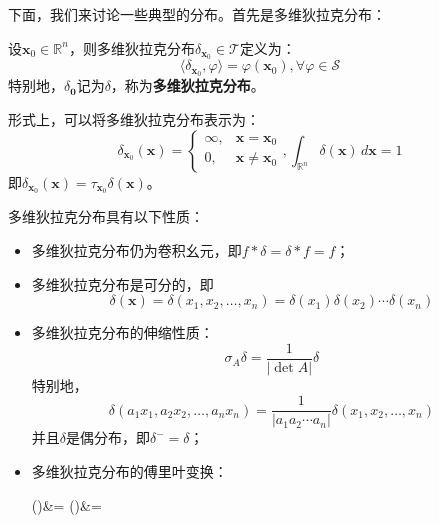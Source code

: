 下面，我们来讨论一些典型的分布。首先是多维狄拉克分布：
\begin{definition}[多维狄拉克分布]
    设$\mathbf{x}_0\in\mathbb{R}^n$，则多维狄拉克分布$\delta_{\mathbf{x}_0}\in\mathcal{T} $定义为：
    \[\langle \delta_{\mathbf{x}_0},\varphi\rangle=\varphi(\mathbf{x}_0),\forall \varphi\in\mathcal{S} \]
    特别地，$\delta_{\mathbf{0}}$记为$\delta$，称为\textbf{多维狄拉克分布}。

    形式上，可以将多维狄拉克分布表示为：
    \[\delta_{\mathbf{x}_0}(\mathbf{x})=\begin{cases}
    \infty,&\mathbf{x}=\mathbf{x}_0\\
    0,&\mathbf{x}\neq \mathbf{x}_0
    \end{cases},\int_{\mathbb{R}^n}\delta(\mathbf{x})\,d\mathbf{x}=1\]
    即$\delta_{\mathbf{x}_0}(\mathbf{x})=\tau_{\mathbf{x}_0}\delta(\mathbf{x})$。
\end{definition}
\begin{proposition}[多维狄拉克分布的性质]
    多维狄拉克分布具有以下性质：
    \begin{itemize}
        \item 多维狄拉克分布仍为卷积幺元，即$f*\delta=\delta*f=f$；
        \item 多维狄拉克分布是可分的，即
        \[\delta(\mathbf{x})=\delta(x_1,x_2,\ldots,x_n)=\delta(x_1)\delta(x_2)\cdots \delta(x_n)\]
        \item 多维狄拉克分布的伸缩性质：
        \[\sigma_A \delta=\frac{1}{|\det A|}\delta\]
        特别地，\[\delta(a_1 x_1,a_2 x_2,\ldots,a_n x_n)=\frac{1}{|a_1 a_2 \cdots a_n|}\delta(x_1,x_2,\ldots,x_n)\]
        并且$\delta$是偶分布，即$\delta^-=\delta$；
        \item 多维狄拉克分布的傅里叶变换：
        \begin{lralign}
         \delta(\boldsymbol{\xi})&=
\switch
         \delta(\boldsymbol{\omega})&=
        \end{lralign}
    \end{itemize}
\end{proposition}
